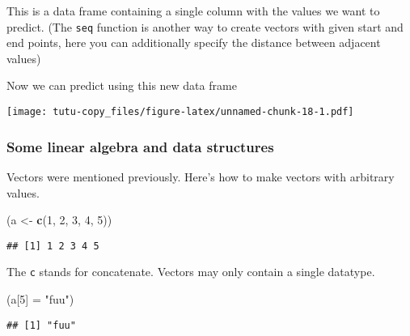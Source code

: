 \documentclass[]{article}
\newenvironment{Shaded}{\begin{snugshade}}{\end{snugshade}}
\newcommand{\KeywordTok}[1]{\textcolor[rgb]{0.13,0.29,0.53}{\textbf{#1}}}
\newcommand{\DataTypeTok}[1]{\textcolor[rgb]{0.13,0.29,0.53}{#1}}
\newcommand{\DecValTok}[1]{\textcolor[rgb]{0.00,0.00,0.81}{#1}}
\newcommand{\StringTok}[1]{\textcolor[rgb]{0.31,0.60,0.02}{#1}}
\newcommand{\OperatorTok}[1]{\textcolor[rgb]{0.81,0.36,0.00}{\textbf{#1}}}
\newcommand{\NormalTok}[1]{#1}
\begin{document}
This is a data frame containing a single column with the values we want
to predict. (The \texttt{seq} function is another way to create vectors
with given start and end points, here you can additionally specify the
distance between adjacent values)

Now we can predict using this new data frame

\begin{Shaded}
\end{Shaded}

\texttt{[image: tutu-copy\_files/figure-latex/unnamed-chunk-18-1.pdf]}

\subsubsection{Some linear algebra and data
structures}\label{some-linear-algebra-and-data-structures}

Vectors were mentioned previously. Here's how to make vectors with
arbitrary values.

\begin{Shaded}
\begin{Highlighting}[]
\NormalTok{(a <-}\StringTok{ }\KeywordTok{c}\NormalTok{(}\DecValTok{1}\NormalTok{, }\DecValTok{2}\NormalTok{, }\DecValTok{3}\NormalTok{, }\DecValTok{4}\NormalTok{, }\DecValTok{5}\NormalTok{))}
\end{Highlighting}
\end{Shaded}

\begin{verbatim}
## [1] 1 2 3 4 5
\end{verbatim}

The \texttt{c} stands for concatenate. Vectors may only contain a single
datatype.

\begin{Shaded}
\begin{Highlighting}[]
\NormalTok{(a[}\DecValTok{5}\NormalTok{] =}\StringTok{ "fuu"}\NormalTok{)}
\end{Highlighting}
\end{Shaded}

\begin{verbatim}
## [1] "fuu"
\end{verbatim}
\end{document}
